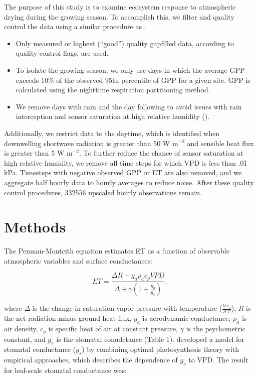 \documentclass[draft,linenumbers]{agujournal}
\begin{document}
The purpose of this study is to examine ecosystem response to atmospheric drying during the growing season. To accomplish this, we filter and quality control the data using a similar procedure as \cite{Zhou_2015}:
\begin{itemize}
\item Only measured or highest (``good'') quality gapfilled data, according to quality control flags, are used.
\item To isolate the growing season, we only use days in which the average GPP exceeds 10\% of the observed 95th percentile of GPP for a given site. GPP is calculated using the nighttime respiration partitioning method.
\item We remove days with rain and the day following to avoid issues with rain interception and sensor saturation at high relative humidity (\cite{MEDLYN_2011}).
\end{itemize}
Additionally, we restrict data to the daytime, which is identified when downwelling shortwave radiation is greater than 50 W m$^{-2}$ and sensible heat flux is greater than 5 W m$^{-2}$. To further reduce the chance of sensor saturation at high relative humidity, we remove all time steps for which VPD is less than .01 kPa. Timesteps with negative observed GPP or ET are also removed, and we aggregate half hourly data to hourly averages to reduce noise. After these quality control procedures, 332556 upscaled hourly observations remain. 

\section{Methods}
\label{methods}
The Penman-Monteith equation \citep [hereafter PM][]{Monteith_1965} estimates ET as a function of observable atmospheric variables and surface conductances:
\begin{linenomath*}
  \begin{equation}
      ET = \frac{\Delta R + g_a \rho_a c_p VPD}{\Delta + \gamma(1 + \frac{g_a}{g_s})},
  \end{equation}
\end{linenomath*}
where $\Delta$ is the change in saturation vapor pressure with temperature ($\frac{\partial \; e_s}{\partial \; T}$), $R$ is the net radiation minus ground heat flux, $g_a$ is aerodynamic conductance, $\rho_a$ is air density, $c_p$ is specific heat of air at constant pressure, $\gamma$ is the psychometric constant, and $g_s$ is the stomatal conudctance (Table 1). \citet{MEDLYN_2011} developed a model for stomatal conductance ($g_s$) by combining optimal photosynthesis theory \citep{Farquhar_1980, Katul_2010} with empirical approaches, which describes the dependence of $g_s$ to VPD. The result for leaf-scale stomatal conductance was:
\end{document}
